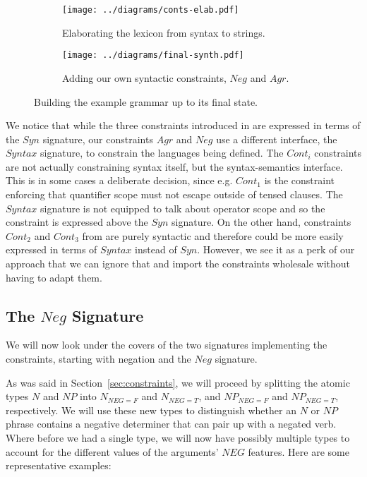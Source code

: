 \documentclass{llncs}
\begin{document}
\begin{figure}[t]
  \centering
  \begin{subfigure}[b]{0.4\textwidth}
    \centering
    \texttt{[image: ../diagrams/conts-elab.pdf]}
    \caption{\label{fig:conts-elab} Elaborating the lexicon from syntax to
      strings. }
  \end{subfigure}
  \qquad
  \begin{subfigure}[b]{0.4\textwidth}
    \centering
    \texttt{[image: ../diagrams/final-synth.pdf]}
    \caption{\label{fig:final-synth} Adding our own syntactic constraints,
      $Neg$ and $Agr$.}
  \end{subfigure}
  \caption{\label{fig:final} Building the example grammar up to its final
    state.}
\end{figure}

We notice that while the three constraints introduced in
\cite{pogodalla2012controlling} are expressed in terms of the $Syn$ signature,
our constraints $Agr$ and $Neg$ use a different interface, the $Syntax$
signature, to constrain the languages being defined. The $Cont_i$ constraints
are not actually constraining syntax itself, but the syntax-semantics
interface. This is in some cases a deliberate decision, since e.g. $Cont_1$ is
the constraint enforcing that quantifier scope must not escape outside of
tensed clauses. The $Syntax$ signature is not equipped to talk about operator
scope and so the constraint is expressed above the $Syn$ signature. On the
other hand, constraints $Cont_2$ and $Cont_3$ from
\cite{pogodalla2012controlling} are purely syntactic and therefore could be
more easily expressed in terms of $Syntax$ instead of $Syn$. However, we see
it as a perk of our approach that we can ignore that and import the
constraints wholesale without having to adapt them.

\subsection{The $Neg$ Signature}

We will now look under the covers of the two signatures implementing the
constraints, starting with negation and the $Neg$ signature.

As was said in Section~\ref{sec:constraints}, we will proceed by splitting the
atomic types $N$ and $NP$ into $N_{NEG{=}F}$ and $N_{NEG{=}T}$, and
$NP_{NEG{=}F}$ and $NP_{NEG{=}T}$, respectively. We will use these new types
to distinguish whether an $N$ or $NP$ phrase contains a negative determiner
that can pair up with a negated verb. Where before we had a single type, we
will now have possibly multiple types to account for the different values of
the arguments' $NEG$ features. Here are some representative examples:
\end{document}

